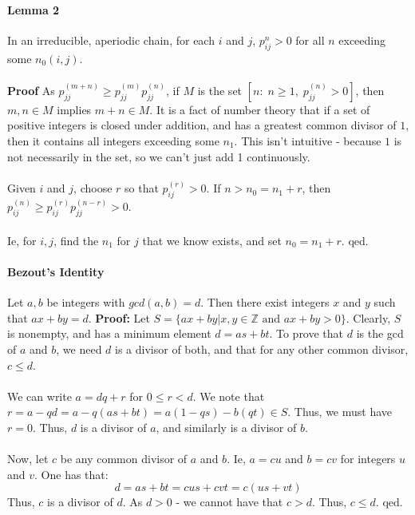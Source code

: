 \documentclass[12pt,a4paper]{article}
\newcommand{\1}[1]{\mathbbm{1}\left\{ #1 \right\}}
\newcommand{\Z}{\mathbb{Z}}
\begin{document}
\paragraph{Lemma 2} In an irreducible, aperiodic chain, for each $i$ and $j$, $p_{ij}^n > 0$ for all $n$ exceeding some $n_0(i,j)$.
\\\\
\textbf{Proof} As $p_{jj}^{(m+n)} \geq p_{jj}^{(m)}p_{jj}^{(n)}$, if $M$ is the set $\left[n : \; n \geq 1, \; p_{jj}^{(n)} > 0\right]$, then $m,n \in M$ implies $m + n \in M$. It is a fact of number theory that if a set of positive integers is closed under addition, and has a greatest common divisor of $1$, then it contains all integers exceeding some $n_1$. This isn't intuitive - because $1$ is not necessarily in the set, so we can't just add 1 continuously.
\\\\
Given $i$ and $j$, choose $r$ so that $p_{ij}^{(r)} > 0$. If $n > n_0  = n_1 + r$, then $p_{ij}^{(n)} \geq p_{ij}^{(r)}p_{jj}^{(n-r)} > 0$.
\\\\
Ie, for $i,j$, find the $n_1$ for $j$ that we know exists, and set $n_0 = n_1 + r$. qed.

\paragraph{Bezout's Identity} Let $a,b$ be integers with $gcd(a,b) = d$. Then there exist integers $x$ and $y$ such that $ax + by = d$. \textbf{Proof:} Let $S = \{ax + by | x,y \in \Z \text{ and } ax + by > 0\}$. Clearly, $S$ is nonempty, and has a minimum element $d = as + bt$. To prove that $d$ is the gcd of $a$ and $b$, we need $d$ is a divisor of both, and that for any other common divisor, $c \leq d$.
\\\\
We can write $a = dq + r$ for $0 \leq r < d$. We note that $r = a - qd = a - q(as + bt) = a(1-qs) - b(qt) \in S$. Thus, we must have $r = 0$. Thus, $d$ is a divisor of $a$, and similarly is a divisor of $b$.
\\\\
Now, let $c$ be any common divisor of $a$ and $b$. Ie, $a = cu$ and $b = cv$ for integers $u$ and $v$. One has that:
$$
	d = as + bt = cus + cvt = c(us + vt)
$$
Thus, $c$ is a divisor of $d$. As $d > 0$ - we cannot have that $c > d$. Thus, $c \leq d$. qed.
\end{document}
